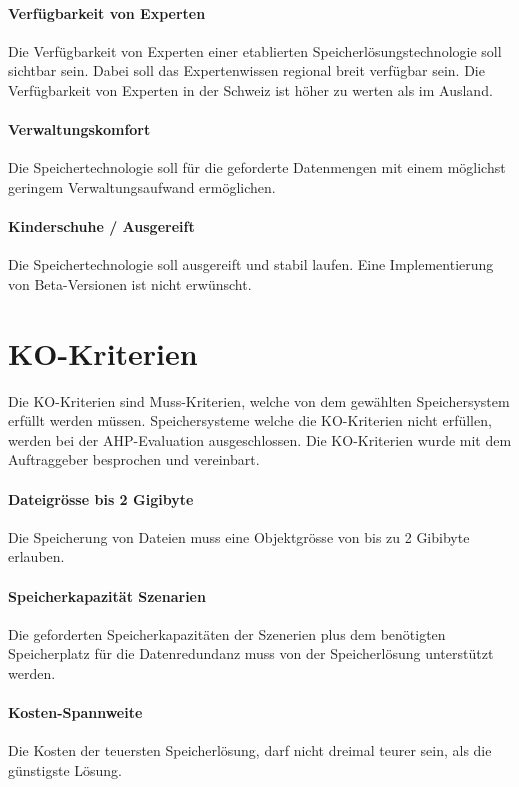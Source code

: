 \paragraph{Verfügbarkeit von Experten}\label{Soll-6-3}
Die Verfügbarkeit von Experten einer etablierten Speicherlösungstechnologie soll sichtbar sein. Dabei soll das Expertenwissen regional breit verfügbar sein. Die Verfügbarkeit von Experten in der Schweiz ist höher zu werten als im Ausland.

\paragraph{Verwaltungskomfort}\label{Soll-6-4}
Die Speichertechnologie soll für die geforderte Datenmengen mit einem möglichst geringem Verwaltungsaufwand ermöglichen.

\paragraph{Kinderschuhe / Ausgereift}\label{Soll-6-5}
Die Speichertechnologie soll ausgereift und stabil laufen. Eine Implementierung von Beta-Versionen ist nicht erwünscht.

\section{KO-Kriterien}
Die KO-Kriterien sind Muss-Kriterien, welche von dem gewählten Speichersystem erfüllt werden müssen. Speichersysteme welche die KO-Kriterien nicht erfüllen, werden bei der AHP-Evaluation ausgeschlossen. Die KO-Kriterien wurde mit dem Auftraggeber besprochen und vereinbart.

\setcounter{paragraph}{0}
\renewcommand\theparagraph{KO-\arabic{paragraph}}

\paragraph{Dateigrösse bis 2 Gigibyte}\label{KO-1}
Die Speicherung von Dateien muss eine Objektgrösse von bis zu 2 Gibibyte erlauben.

\paragraph{Speicherkapazität Szenarien}\label{KO-2}
Die geforderten Speicherkapazitäten der Szenerien plus dem benötigten Speicherplatz für die Datenredundanz muss von der Speicherlösung unterstützt werden.

\paragraph{Kosten-Spannweite}\label{KO-3}
Die Kosten der teuersten Speicherlösung, darf nicht dreimal teurer sein, als die günstigste Lösung.

